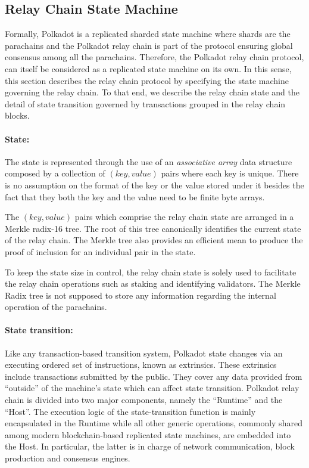 \subsection{Relay Chain State Machine}\label{sec:relaychain}

Formally, Polkadot is a replicated sharded state machine where shards are the parachains and the Polkadot relay chain is part of the protocol ensuring global consensus among all the parachains. Therefore, the Polkadot relay chain protocol, can itself be considered as a replicated state machine on its own. In this sense, this section describes the relay chain protocol by specifying the state machine governing the relay chain. To that end, we describe the relay chain state and the detail of state transition governed by transactions grouped in the relay chain blocks.

\paragraph{State:} The state is represented through the use of an \emph{associative array} data structure composed by a collection of $(key, value)$ pairs where each key is unique. There is no assumption on the format of the key or the value stored under it besides the fact that they both the key and the value need to be finite byte arrays.

The $(key, value)$ pairs which comprise the relay chain state are arranged in a Merkle radix-16 tree. The root of this tree canonically identifies the current state of the relay chain. The Merkle tree also provides an efficient mean to produce the  proof of inclusion for an individual pair in the state.

To keep the state size in control, the relay chain state is solely used to facilitate the relay chain operations such as staking and identifying validators. The Merkle Radix tree is not supposed to store any information regarding the internal operation of the parachains.

\paragraph{State transition: } \label{par:state_transition} Like any transaction-based transition system, Polkadot state changes via an executing ordered set of instructions, known as extrinsics. These extrinsics include transactions submitted by the public. They cover any data provided from ``outside'' of the machine's state which can affect state transition. Polkadot relay chain is divided into two major components, namely the ``Runtime'' and the ``Host''. The execution logic of the state-transition function is mainly encapsulated in the Runtime while all other generic operations, commonly shared among modern blockchain-based replicated state machines, are embedded into the Host. In particular, the latter is in charge of network communication, block production and consensus engines.

